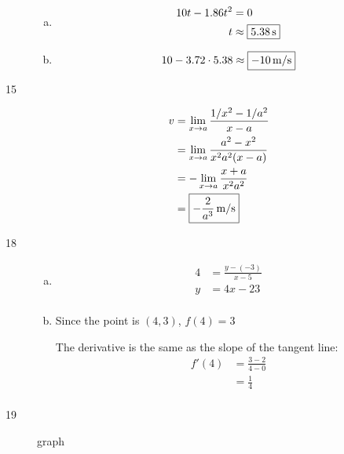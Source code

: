 \documentclass[letterpaper, landscape]{exam}
\begin{document}
\begin{description}
\begin{enumerate}[(a)]
          \item
            \begin{align*}
              10t - 1.86t^2 & = 0 \\
              t             & \approx \boxed{ \unit[5.38]{s} } \\
            \end{align*}

          \item
            \[
              10 - 3.72 \cdot 5.38 \approx \boxed{ \unit[-10]{m/s} }
            \]

        \end{enumerate}

      \item[15]
        \begin{align*}
          v & = \lim_{x \to a} \frac{ 1/x^2 - 1/a^2}{x - a} \\
            & = \lim_{x \to a} \frac{ a^2 - x^2}{x^2a^2 (x - a)} \\
            & = - \lim_{x \to a} \frac{ x + a}{x^2a^2} \\
            & = \boxed{ \unit[- \frac{2}{a^3}]{m/s} } \\
        \end{align*}

      \item[18]
        \begin{enumerate}[(a)]

          \item 
            \begin{align*}
              4 & = \frac{y - (-3)}{x - 5} \\
              y & = 4x - 23 \\
            \end{align*}

          \item Since the point is $(4, 3)$, $f(4) = 3$

            The derivative is the same as the slope of the tangent line:
            \begin{align*}
              f'(4) & = \frac{3 - 2}{4 - 0} \\
                    & = \boxed{ \frac{1}{4} } \\
            \end{align*}

        \end{enumerate}

      \item[19] graph


\end{description}
\end{document}
